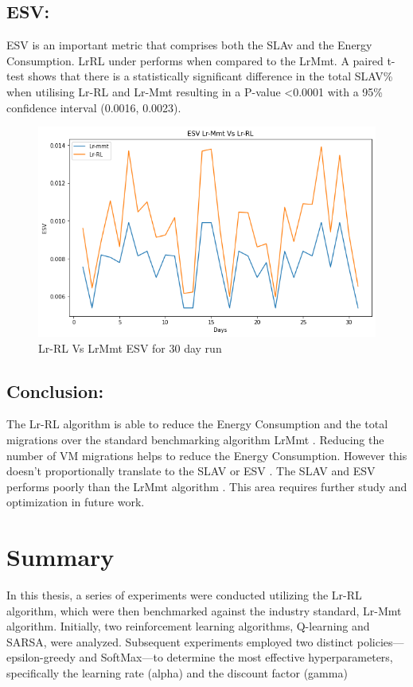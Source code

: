\documentclass[a4paper,12pt]{Classes/RoboticsLaTeX}
\begin{document}
        \section{ESV:}
        ESV is an important metric that comprises both the SLAv and the Energy Consumption. LrRL under performs when compared to the LrMmt.
        A paired t-test shows that there is a statistically significant difference in the total SLAV\%  when utilising Lr-RL and Lr-Mmt resulting in a P-value <0.0001 with a 95\% confidence interval (0.0016, 0.0023).

        \begin{figure}[H]
            \centering
            \includegraphics[width=1.0\linewidth]{Figures/ESV_30day.png}
            \caption{Lr-RL Vs LrMmt ESV for 30 day run}
            \label{fig:enter-label}
        \end{figure}
        

	\section{Conclusion:}
         The Lr-RL algorithm is able to reduce the Energy Consumption and the total migrations over the standard benchmarking algorithm LrMmt . Reducing the number of VM migrations helps to reduce the Energy Consumption. However this doesn't proportionally translate to the SLAV or ESV . The SLAV and ESV performs poorly than the LrMmt algorithm . This area requires further study and optimization in future work.

	\chapter{Summary}
	\label{chap:Summary}
         In this thesis, a series of experiments were conducted utilizing the Lr-RL algorithm, which were then benchmarked against the industry standard, Lr-Mmt algorithm. Initially, two reinforcement learning algorithms, Q-learning and SARSA, were analyzed. Subsequent experiments employed two distinct policies—epsilon-greedy and SoftMax—to determine the most effective hyperparameters, specifically the learning rate (alpha) and the discount factor (gamma)
         
\end{document}
